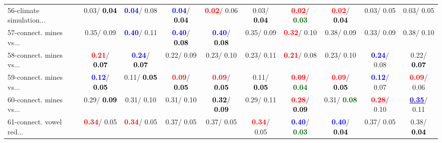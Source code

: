 \begin{table}[h]
\begin{center}
{\begin{tabular}{lc|c|c|c|c|c|c|c|c}
56-climate simulation... &   0.03/\textcolor{black}{\textbf{  0.04}} & \textcolor{blue}{\textbf{  0.04}}/  0.08 & \textcolor{blue}{\textbf{  0.04}}/\textcolor{black}{\textbf{  0.04}} & \textcolor{red}{\textbf{  0.02}}/  0.06 &   0.03/\textcolor{black}{\textbf{  0.04}} & \textcolor{red}{\textbf{  0.02}}/\textcolor{darkgreen}{\textbf{  0.03}} & \textcolor{red}{\textbf{  0.02}}/\textcolor{black}{\textbf{  0.04}} &   0.03/  0.05 &   0.03/  0.05 \\
57-connect. mines vs... &   0.35/  0.09 & \textcolor{blue}{\textbf{  0.40}}/  0.11 & \textcolor{blue}{\textbf{  0.40}}/\textcolor{black}{\textbf{  0.08}} & \textcolor{blue}{\textbf{  0.40}}/\textcolor{black}{\textbf{  0.08}} &   0.35/  0.09 & \textcolor{red}{\textbf{  0.32}}/  0.10 &   0.38/  0.09 &   0.33/  0.09 &   0.38/  0.10 \\
58-connect. mines vs... & \textcolor{red}{\textbf{  0.21}}/\textcolor{black}{\textbf{  0.07}} & \textcolor{blue}{\textbf{  0.24}}/\textcolor{black}{\textbf{  0.07}} &   0.22/  0.09 &   0.23/  0.10 &   0.23/  0.11 & \textcolor{red}{\textbf{  0.21}}/  0.08 &   0.23/  0.10 & \textcolor{blue}{\textbf{  0.24}}/  0.08 &   0.22/\textcolor{black}{\textbf{  0.07}} \\
59-connect. mines vs... & \textcolor{blue}{\textbf{  0.12}}/\textcolor{black}{\textbf{  0.05}} &   0.11/\textcolor{black}{\textbf{  0.05}} & \textcolor{red}{\textbf{  0.09}}/\textcolor{black}{\textbf{  0.05}} & \textcolor{red}{\textbf{  0.09}}/\textcolor{black}{\textbf{  0.05}} &   0.11/\textcolor{black}{\textbf{  0.05}} & \textcolor{red}{\textbf{  0.09}}/\textcolor{darkgreen}{\textbf{  0.04}} & \textcolor{red}{\textbf{  0.09}}/\textcolor{black}{\textbf{  0.05}} & \textcolor{blue}{\textbf{  0.12}}/  0.07 & \textcolor{red}{\textbf{  0.09}}/  0.06 \\
60-connect. mines vs... &   0.29/\textcolor{black}{\textbf{  0.09}} &   0.31/  0.10 &   0.31/  0.10 & \textcolor{black}{\textbf{  0.32}}/\textcolor{black}{\textbf{  0.09}} &   0.29/  0.11 & \textcolor{red}{\textbf{  0.28}}/\textcolor{black}{\textbf{  0.09}} &   0.31/\textcolor{darkgreen}{\textbf{  0.08}} & \textcolor{red}{\textbf{  0.28}}/  0.10 & \underline{\textcolor{blue}{\textbf{  0.35}}}/  0.11 \\ \hline
61-connect. vowel red... & \textcolor{red}{\textbf{  0.34}}/  0.05 & \textcolor{red}{\textbf{  0.34}}/  0.05 &   0.37/  0.05 &   0.37/  0.05 & \textcolor{red}{\textbf{  0.34}}/  0.05 & \textcolor{blue}{\textbf{  0.40}}/\textcolor{darkgreen}{\textbf{  0.03}} & \textcolor{blue}{\textbf{  0.40}}/\textcolor{black}{\textbf{  0.04}} &   0.37/  0.05 &   0.38/\textcolor{black}{\textbf{  0.04}} \\

\end{tabular}}
\end{center}
\end{table}
